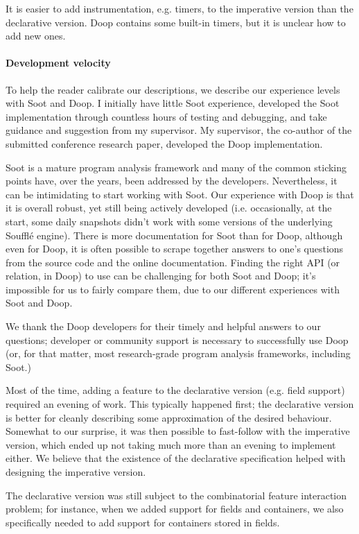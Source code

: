 It is easier to add instrumentation, e.g. timers, to the imperative version than the declarative version. Doop contains some built-in timers, but it is unclear how to add new ones.

\paragraph{Development velocity}
To help the reader calibrate our descriptions, we describe our experience levels with Soot and Doop. I initially have little Soot experience, developed the Soot implementation through countless hours of testing and debugging, and take guidance and suggestion from my supervisor. My supervisor, the co-author of the submitted conference research paper, developed the Doop implementation.

Soot is a mature program analysis framework and many of the common sticking points have, over the years, been addressed by the developers. Nevertheless, it can be intimidating to start working with Soot. Our experience with Doop is that it is overall robust, yet still being actively developed (i.e. occasionally, at the start, some daily snapshots didn't work with some versions of the underlying Soufflé engine). There is more documentation for Soot than for Doop, although even for Doop, it is often possible to scrape together answers to one's questions from the source code and the online documentation. Finding the right API (or relation, in Doop) to use can be challenging for both Soot and Doop; it's impossible for us to fairly compare them, due to our different experiences with Soot and Doop.

We thank the Doop developers for their timely and helpful answers to our questions; developer or community support is necessary to successfully use Doop (or, for that matter, most research-grade program analysis frameworks, including Soot.)

Most of the time, adding a feature to the declarative version (e.g. field support) required an evening of work. This typically happened first; the declarative version is better for cleanly describing some approximation of the desired behaviour. Somewhat to our surprise, it was then possible to fast-follow with the imperative version, which ended up not taking much more than an evening to implement either. We believe that the existence of the declarative specification helped with designing the imperative version.

The declarative version was still subject to the combinatorial feature interaction problem; for instance, when we added support for fields and containers, we also specifically needed to add support for containers stored in fields.

